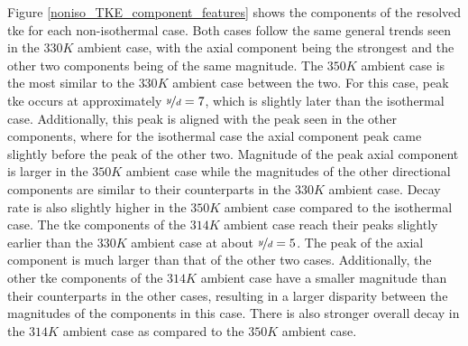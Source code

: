 Figure \ref{noniso_TKE_component_features} shows the components of the resolved \gls{tke} for each non-isothermal case. Both cases follow the same general trends seen in the $330 K$ ambient case, with the axial component being the strongest and the other two components being of the same magnitude. The $350 K$ ambient case is the most similar to the $330 K$ ambient case between the two. For this case, peak \gls{tke} occurs at approximately $\nicefrac{y}{d} = 7$, which is slightly later than the isothermal case. Additionally, this peak is aligned with the peak seen in the other components, where for the isothermal case the axial component peak came slightly before the peak of the other two. Magnitude of the peak axial component is larger in the $350 K$ ambient case while the magnitudes of the other directional components are similar to their counterparts in the $330 K$ ambient case. Decay rate is also slightly higher in the $350 K$ ambient case compared to the isothermal case. The \gls{tke} components of the $314 K$ ambient case reach their peaks slightly earlier than the $330 K$ ambient case at about $\nicefrac{y}{d} = 5$. The peak of the axial component is much larger than that of the other two cases. Additionally, the other \gls{tke} components of the $314 K$ ambient case have a smaller magnitude than their counterparts in the other cases, resulting in a larger disparity between the magnitudes of the components in this case. There is also stronger overall decay in the $314 K$ ambient case as compared to the $350 K$ ambient case.

